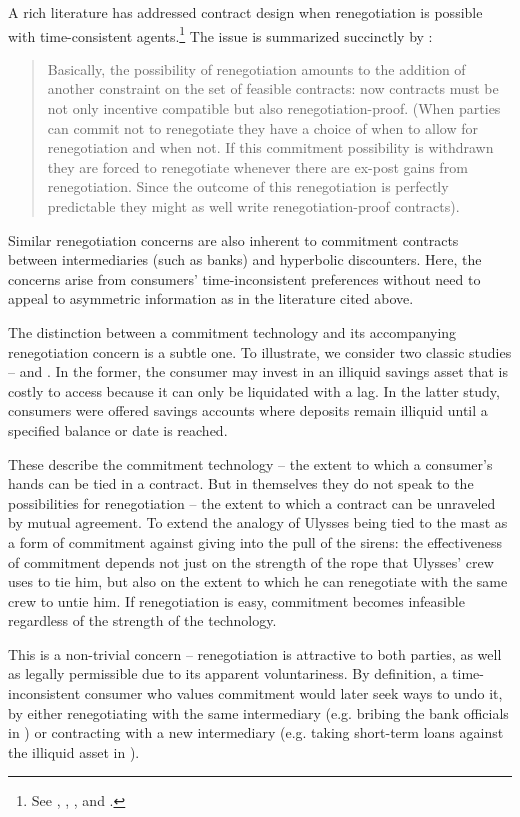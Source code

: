 \documentclass[11pt,english]{article}
\theoremstyle{plain}
\theoremstyle{definition}
\begin{document}
A rich literature has addressed contract design when renegotiation is possible with time-consistent agents.\footnote{See \citet{hart1988}, \citet{dewatripont1989}, \citet{bolton1990}, and \citet{rubinstein1992}.} The issue is  summarized succinctly by \citet[p303]{bolton1990}:
\begin{quote}
Basically, the possibility of renegotiation amounts to the addition of another constraint on the set of feasible contracts: now contracts must be not only incentive compatible but also renegotiation-proof. (When parties can commit not to renegotiate they have a choice of when to allow for renegotiation and when not. If this commitment possibility is withdrawn they are forced to renegotiate whenever there are ex-post gains from renegotiation. Since the outcome of this renegotiation is perfectly predictable they might as well write renegotiation-proof
contracts).
\end{quote}

Similar renegotiation concerns are  also inherent to commitment contracts between intermediaries (such as banks) and hyperbolic discounters. Here, the concerns arise from consumers' time-inconsistent preferences without need to appeal to asymmetric information as in the literature cited above. 

The distinction between a commitment technology and its accompanying renegotiation concern is a subtle one. To illustrate, we consider two classic studies --  \citet{laibson1997} and \citet{ashraf2006}. In the former, the consumer may invest in an illiquid savings asset that is costly to access because it can only be liquidated with a lag. In the latter study, consumers were offered savings accounts where deposits remain illiquid until a specified balance or date is reached.

These describe the commitment technology -- the extent to which a consumer's hands can be tied in a contract. But in themselves they do not speak to the possibilities for renegotiation -- the extent to which a contract can be unraveled by mutual agreement. To extend the \citet{ashraf2006} analogy of Ulysses being tied to the mast as a form of commitment against giving into the pull of the sirens: the effectiveness of commitment depends not just on the strength of the rope that Ulysses' crew uses to tie him, but also on the extent to which he can renegotiate with the same crew to untie him. If renegotiation is easy, commitment becomes infeasible regardless of the strength of the technology.

This is a non-trivial concern -- renegotiation is attractive to both parties,  as well as legally permissible due to its apparent voluntariness. By definition, a time-inconsistent consumer who values commitment would later seek ways to undo it, by either renegotiating with the same intermediary (e.g. bribing the bank officials in \citealp{ashraf2006}) or contracting with a new intermediary (e.g. taking short-term loans against the illiquid asset in \citealp{laibson1997}).
\end{document}

